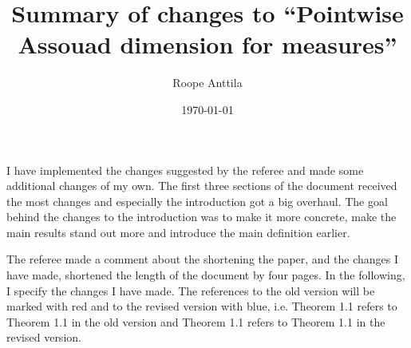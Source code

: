 \documentclass[12pt]{amsart}
\numberwithin{equation}{section}
\newcommand{\old}[1]{{\color{red} #1}}
\newcommand{\new}[1]{{\color{blue} #1}}
\theoremstyle{plain}
\theoremstyle{definition}
\theoremstyle{remark}
\begin{document}
\title{Summary of changes to ``Pointwise Assouad dimension for measures''}
\author{Roope Anttila}

\date{\today}

\maketitle

I have implemented the changes suggested by the referee and made some additional changes of my own. The first three sections of the document received the most changes and especially the introduction got a big overhaul. The goal behind the changes to the introduction was to make it more concrete, make the main results stand out more and introduce the main definition earlier.

The referee made a comment about the shortening the paper, and the changes I have made, shortened the length of the document by four pages. In the following, I specify the changes I have made. The references to the old version will be marked with \old{red} and to the revised version with \new{blue}, i.e. \old{Theorem 1.1} refers to Theorem 1.1 in the old version and \new{Theorem 1.1} refers to Theorem 1.1 in the revised version.
\end{document}
